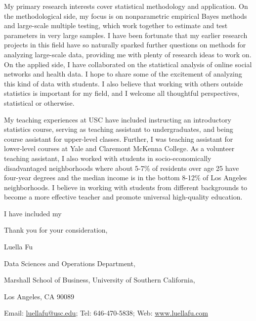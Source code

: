 \documentclass[a4paper]{article}
\begin{document}
	\medskip
	
	My primary research interests cover statistical methodology and application. On the methodological side, my focus is on nonparametric empirical Bayes methods and large-scale multiple testing, which work together to estimate and test parameters in very large samples.  I have been fortunate that my earlier research projects in this field have so naturally sparked further questions on methods for analyzing large-scale data, providing me with plenty of research ideas to work on. On the applied side, I have collaborated on the statistical analysis of online social networks and health data. I hope to share some of the excitement of analyzing this kind of data with students. I also believe that working with others outside statistics is important for my field, and I welcome all thoughtful perspectives, statistical or otherwise.
	
	\medskip
	
	My teaching experiences at USC have included instructing an introductory statistics course, serving as teaching assistant to undergraduates, and being course assistant for upper-level classes. Further, I was teaching assistant for lower-level courses at Yale and Claremont McKenna College. As a volunteer teaching assistant, I also worked with students in socio-economically disadvantaged neighborhoods where about 5-7\% of residents over age 25 have four-year degrees and the median income is in the bottom 8-12\% of Los Angeles neighborhoods. I believe in working with students from different backgrounds to become a more effective teacher and promote universal high-quality education.
	
	\medskip
	
	I have included my %
	
	\bigskip
	
	\noindent Thank you for your consideration, 
	
	\noindent Luella Fu
	
	\medskip
	
	{\footnotesize
	\noindent Data Sciences and Operations Department, 
	
	\noindent Marshall School of Business, University of Southern California,
	
	\noindent Los Angeles, CA 90089
	
	\noindent Email: \url{luellafu@usc.edu}; Tel: 646-470-5838; Web: \url{www.luellafu.com}
	}
	
\end{document}
